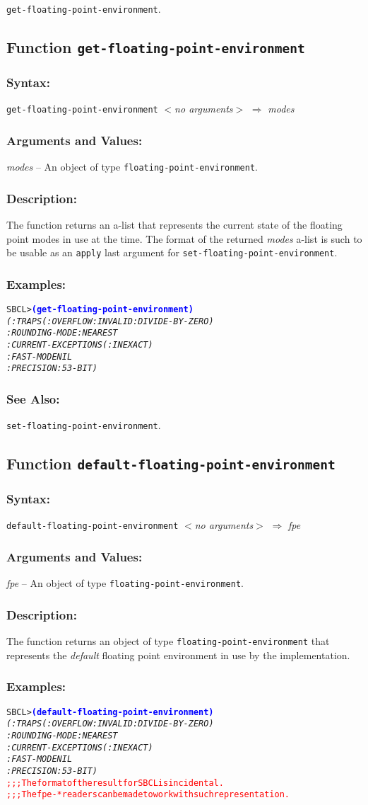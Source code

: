 \documentclass[10pt,fleqn]{article}
\newcommand{\code}[1]{\texttt{#1}}
\newcommand{\varname}[1]{\textit{#1}}
\newcommand{\codeprompt}[1]{\textcolor{blue}{\textbf{#1}}}
\newcommand{\DDictionaryItem}[1]{\vspace*{6pt}\noindent\hrulefill\vspace*{-9pt}\subsection*{#1}}
\newcommand{\DSyntax}{\subsubsection*{Syntax:}}
\newcommand{\DArgsNValues}{\subsubsection*{Arguments and Values:}}
\newcommand{\DDescription}{\subsubsection*{Description:}}
\newcommand{\DExamples}{\subsubsection*{Examples:}}
\newcommand{\DSeeAlso}{\subsubsection*{See Also:}}
\begin{document}
\code{get-floating-point-environment}.


\DDictionaryItem{Function \code{get-floating-point-environment}}

\DSyntax{}

\code{get-floating-point-environment} \textit{$<$no arguments$>$}
$\Rightarrow$ \varname{modes}

\DArgsNValues{}

\varname{modes} --  An object of type \code{floating-point-environment}.


\DDescription{}

The function returns an a-list that represents the current state of
the floating point modes in use at the time.  The format of the
returned \varname{modes} a-list is such to be
usable as an \code{apply} last argument for
\code{set-floating-point-environment}.


\DExamples{}

\begin{alltt}
SBCL> \codeprompt{(get-floating-point-environment)}
\textit{(:TRAPS (:OVERFLOW :INVALID :DIVIDE-BY-ZERO)
 :ROUNDING-MODE :NEAREST
 :CURRENT-EXCEPTIONS (:INEXACT)
 :FAST-MODE NIL
 :PRECISION :53-BIT)}
\end{alltt}


\DSeeAlso{}

\code{set-floating-point-environment}.


\DDictionaryItem{Function \code{default-floating-point-environment}}

\DSyntax{}

\code{default-floating-point-environment} \textit{$<$no arguments$>$}
$\Rightarrow$ \varname{fpe}

\DArgsNValues{}

\varname{fpe} -- An object of type \code{floating-point-environment}.

\DDescription{}

The function returns an object of type
\code{floating-point-environment} that represents the \emph{default}
floating point environment in use by the implementation.


\DExamples{}

\begin{alltt}
SBCL> \codeprompt{(default-floating-point-environment)}
\textit{(:TRAPS (:OVERFLOW :INVALID :DIVIDE-BY-ZERO)
 :ROUNDING-MODE :NEAREST
 :CURRENT-EXCEPTIONS (:INEXACT)
 :FAST-MODE NIL
 :PRECISION :53-BIT)}
\textcolor{red}{;;; The format of the result for SBCL is incidental.
;;; The fpe-* readers can be made to work with such representation.}
\end{alltt}
\end{document}
